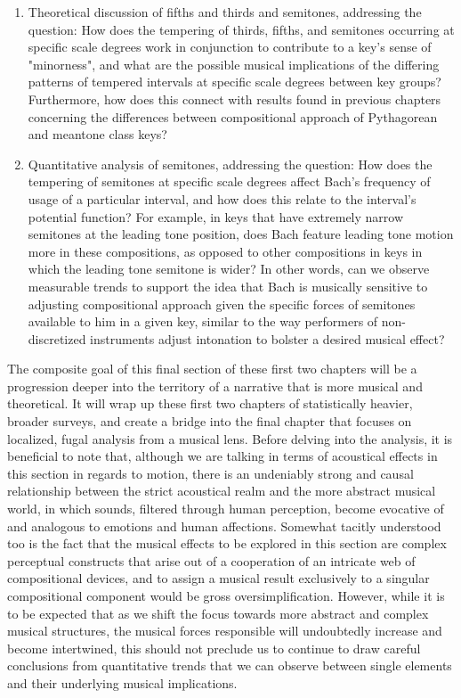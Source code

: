 \begin{enumerate}
\def\labelenumi{\arabic{enumi}.}
\tightlist
\item
  Theoretical discussion of fifths and thirds and semitones, addressing
  the question: How does the tempering of thirds, fifths, and semitones
  occurring at specific scale degrees work in conjunction to contribute
  to a key's sense of "minorness", and what are the possible musical
  implications of the differing patterns of tempered intervals at
  specific scale degrees between key groups? Furthermore, how does this
  connect with results found in previous chapters concerning the
  differences between compositional approach of Pythagorean and meantone
  class keys?
\item
  Quantitative analysis of semitones, addressing the question: How does
  the tempering of semitones at specific scale degrees affect Bach's
  frequency of usage of a particular interval, and how does this relate
  to the interval's potential function? For example, in keys that have
  extremely narrow semitones at the leading tone position, does Bach
  feature leading tone motion more in these compositions, as opposed to
  other compositions in keys in which the leading tone semitone is
  wider? In other words, can we observe measurable trends to support the
  idea that Bach is musically sensitive to adjusting compositional
  approach given the specific forces of semitones available to him in a
  given key, similar to the way performers of non-discretized
  instruments adjust intonation to bolster a desired musical effect?
\end{enumerate}

The composite goal of this final section of these first two chapters
will be a progression deeper into the territory of a narrative that is
more musical and theoretical. It will wrap up these first two chapters
of statistically heavier, broader surveys, and create a bridge into the
final chapter that focuses on localized, fugal analysis from a musical
lens. Before delving into the analysis, it is beneficial to note that,
although we are talking in terms of acoustical effects in this section
in regards to motion, there is an undeniably strong and causal
relationship between the strict acoustical realm and the more abstract
musical world, in which sounds, filtered through human perception,
become evocative of and analogous to emotions and human affections.
Somewhat tacitly understood too is the fact that the musical effects to
be explored in this section are complex perceptual constructs that arise
out of a cooperation of an intricate web of compositional devices, and
to assign a musical result exclusively to a singular compositional
component would be gross oversimplification. However, while it is to be
expected that as we shift the focus towards more abstract and complex
musical structures, the musical forces responsible will undoubtedly
increase and become intertwined, this should not preclude us to continue
to draw careful conclusions from quantitative trends that we can observe
between single elements and their underlying musical implications.

